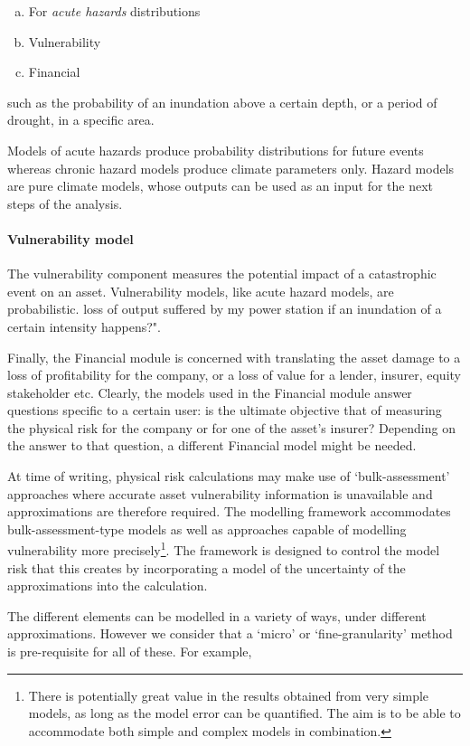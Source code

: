 \documentclass[a4paper,11pt]{extarticle} %
\begin{document}
\begin{enumerate}[a)]
	\item For \emph{acute hazards} distributions 
	\item Vulnerability
	\item Financial
\end{enumerate}
  such as the probability of an inundation above a certain depth, or a period of drought, in a specific area. 

Models of acute hazards produce probability distributions for future events whereas chronic hazard models produce climate parameters only. Hazard models are pure climate models, whose outputs can be used as an input for the next steps of the analysis. 

\paragraph{Vulnerability model}
The vulnerability component measures the potential impact of a catastrophic event on an asset. Vulnerability models, like acute hazard models, are probabilistic.  loss of output suffered by my power station if an inundation of a certain intensity happens?". 

Finally, the Financial module is concerned with translating the asset damage to a loss of profitability for the company, or a loss of value for a lender, insurer, equity stakeholder etc. Clearly, the models used in the Financial module answer questions specific to a certain user: is the ultimate objective that of measuring the physical risk for the company or for one of the asset's insurer? Depending on the answer to that question, a different Financial model might be needed. 


At time of writing, physical risk calculations may make use of `bulk-assessment' approaches where accurate asset vulnerability information is unavailable and approximations are therefore required. The modelling framework accommodates bulk-assessment-type models as well as approaches capable of modelling vulnerability more precisely\footnote{There is potentially great value in the results obtained from very simple models, as long as the model error can be quantified. The aim is to be able to accommodate both simple and complex models in combination.}. The framework is designed to control the model risk that this creates by incorporating a model of the uncertainty of the approximations into the calculation.

 The different elements can be modelled in a variety of ways, under different approximations. However we consider that a `micro' or `fine-granularity' method is pre-requisite for all of these. For example, 
\end{document}
